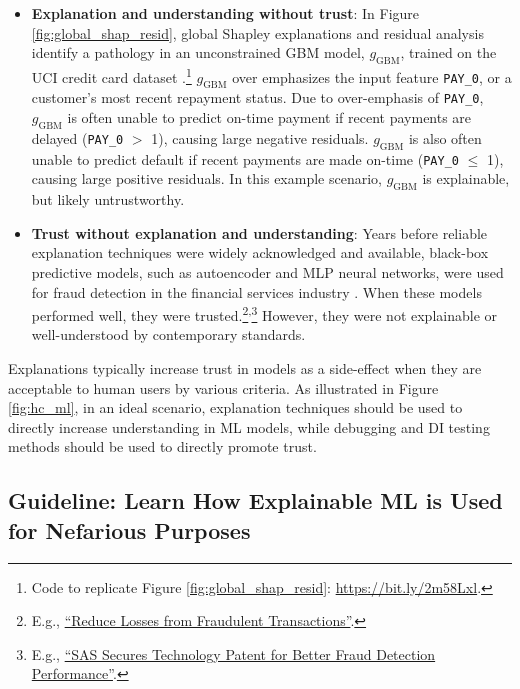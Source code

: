 \documentclass{article}
\begin{document}
\begin{itemize}

\item \textbf{Explanation and understanding without trust}: In Figure \ref{fig:global_shap_resid}, global Shapley explanations and residual analysis identify a pathology in an unconstrained GBM model, $g_{\text{GBM}}$, trained on the UCI credit card dataset \cite{uci}.\footnote{\scriptsize{Code to replicate Figure \ref{fig:global_shap_resid}: \url{https://bit.ly/2m58Lxl}.}} $g_{\text{GBM}}$ over emphasizes the input feature \texttt{PAY\_0}, or a customer's most recent repayment status. Due to over-emphasis of \texttt{PAY\_0}, $g_{\text{GBM}}$ is often unable to predict on-time payment if recent payments are delayed (\texttt{PAY\_0} $>$ 1), causing large negative residuals. $g_{\text{GBM}}$ is also often unable to predict default if recent payments are made on-time (\texttt{PAY\_0} $\leq$ 1), causing large positive residuals. In this example scenario, $g_{\text{GBM}}$ is explainable, but likely untrustworthy. 

\item \textbf{Trust without explanation and understanding}: Years before reliable explanation techniques were widely acknowledged and available, black-box predictive models, such as autoencoder and MLP neural networks, were used for fraud detection in the financial services industry \cite{gopinathan1998fraud}. When these models performed well, they were trusted.\footnote{\scriptsize{E.g., \href{https://www.sas.com/en_ph/customers/hsbc.html}{``Reduce Losses from Fraudulent Transactions''}.}}\textsuperscript{,}\footnote{\scriptsize{E.g., \href{https://www.kdnuggets.com/2011/03/sas-patent-fraud-detection.html}{``SAS Secures Technology Patent for Better Fraud Detection Performance''}.}} However, they were not explainable or well-understood by contemporary standards.  

\end{itemize}
Explanations typically increase trust in models as a side-effect when they are acceptable to human users by various criteria. As illustrated in Figure \ref{fig:hc_ml}, in an ideal scenario, explanation techniques should be used to directly increase understanding in ML models, while debugging and DI testing methods should be used to directly promote trust.

\subsection{Guideline: Learn How Explainable ML is Used for Nefarious Purposes}
\end{document}
